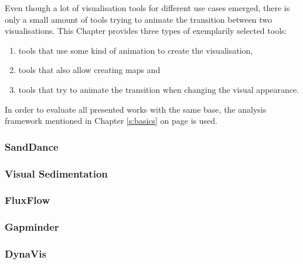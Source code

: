 Even though a lot of visualisation tools for different use cases emerged, there is only a small amount of tools trying to animate the transition between two visualisations. This Chapter provides three types of exemplarily selected tools:

\begin{enumerate}
\item tools that use some kind of animation to create the visualisation,
\item tools that also allow creating maps and
\item tools that try to animate the transition when changing the visual appearance.
\end{enumerate}

In order to evaluate all presented works with the same base, the analysis framework mentioned in Chapter \ref{s:basics} on page \pageref{s:basics} is used.

\subsubsection{SandDance}


\subsubsection{Visual Sedimentation}


\subsubsection{FluxFlow}


\subsubsection{Gapminder}


\subsubsection{DynaVis}

